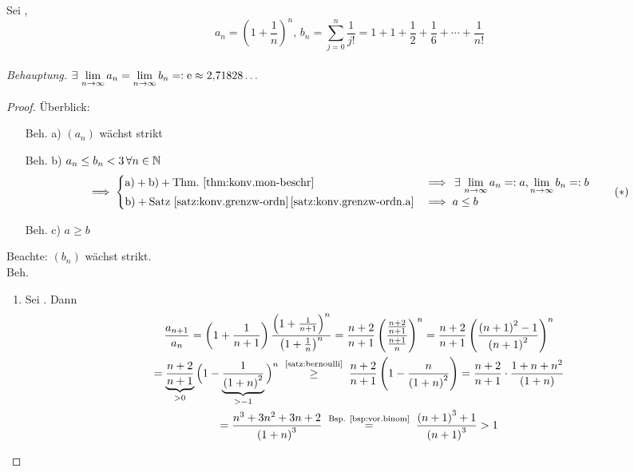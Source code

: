 \documentclass[12pt]{scrreprt}
\begin{document}
\begin{bsp}
  \label{bsp:konv.e}
  Sei , \[a_n = \left(1+\frac1n\right)^n \text{, }
  b_n=\sum_{j=0}^{n}{\frac{1}{j!}} =
  1+1+\frac12+\frac16+\dotsb+\frac{1}{n!}\]\\
  \emph{Behauptung.}
  $\exists\,\lim\limits_{n\rightarrow\infty}{a_n}=\lim\limits_{n\rightarrow\infty}{b_n}=:\mathrm{e}\approx2{,}71828\dotsc$
  \begin{proof}
    Überblick:
    \begin{enumerate}
    \item[Beh. a)] $(a_n)$ wächst strikt
    \item[Beh. b)] $a_n \le b_n < 3 \,\forall n\in\mathbb{N}$
      \begin{equation} \label{eqn:konv.e.stern} \implies \begin{cases}
          \text{a)}+\text{b)}+\text{Thm.~\ref{thm:konv.mon-beschr}}
          &\implies \,\exists\,\lim\limits_{n\rightarrow\infty}{a_n}=:a,
          \lim\limits_{n\rightarrow\infty}{b_n}=:b \\ \text{b)}+\text{Satz
            \ref{satz:konv.grenzw-ordn}\,\ref{satz:konv.grenzw-ordn.a}}
          &\implies a \le b \end{cases} \tag{$*$}
      \end{equation}
    \item[Beh. c)] $a \ge b$
    \end{enumerate}
    Beachte: $(b_n)$ wächst strikt.\\\folgt Beh.
    \begin{enumerate}
    \item Sei . Dann
      \begin{gather*}
        \frac{a_{n+1}}{a_n} = \left(1+\frac{1}{n+1}\right)
        \frac{\left(1+\frac{1}{n+1}\right)^n}{\left(1+\frac1n\right)^n}
        = \frac{n+2}{n+1} \left( \frac{\frac{n+2}{n+1}}{\frac{n+1}{n}}
        \right)^n = \frac{n+2}{n+1} \left(
          \frac{\left(n+1\right)^2-1}{\left(n+1\right)^2} \right)^n
        \\= \underbrace{\frac{n+2}{n+1}}_{>0}
        \Big(1-\underbrace{\frac{1}{\left(1+n\right)^2}}_{>-1} \Big)^n
        \nach{\ge}{\ref{satz:bernoulli}} \frac{n+2}{n+1}
        \left(1-\frac{n}{\left(1+n\right)^2} \right) = \frac{n+2}{n+1}
        \cdot \frac{1+n+n^2}{\left(1+n\right)} \\=
        \frac{n^3+3n^2+3n+2}{\left(1+n\right)^3}
        \nach{=}{\text{Bsp. \ref{bsp:vor.binom}}}
        \frac{\left(n+1\right)^3+1}{\left(n+1\right)^3} > 1
      \end{gather*}

\end{enumerate}
\end{proof}
\end{bsp}
\end{document}
